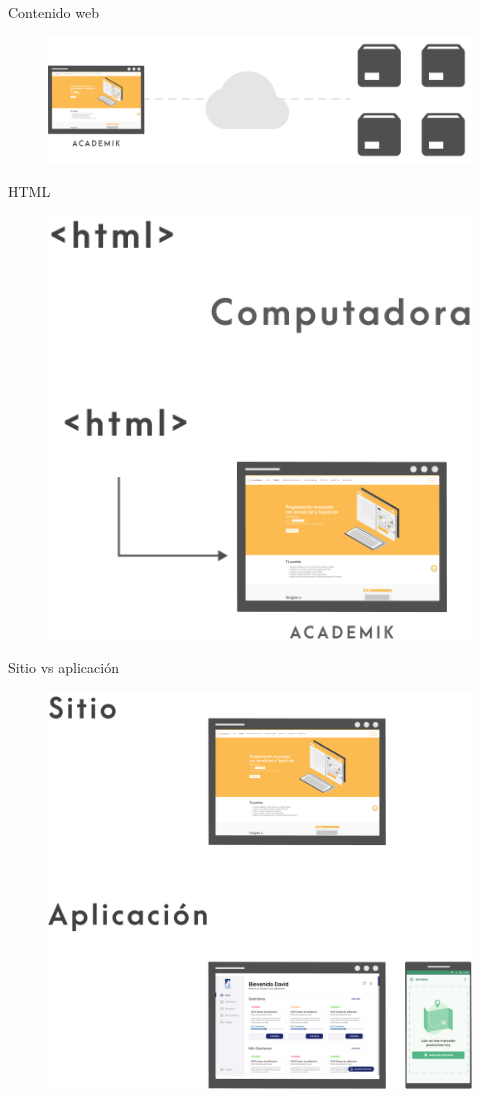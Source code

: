 \documentclass[aspectratio=169]{beamer}
\begin{document}
\begin{frame}{Contenido web}
	\begin{figure}
		\centering
		\includegraphics[width=\linewidth]{Images/internet}
	\end{figure}
\end{frame}

\begin{frame}{HTML}
	\begin{figure}
		\centering
		\includegraphics[width=0.50\linewidth]{Images/html.png}
	\end{figure}
\end{frame}


\begin{frame}{Sitio vs aplicación}
	\begin{figure}
		\centering
		\includegraphics[width=0.55\linewidth]{Images/sitioaplicacion}
	\end{figure}
\end{frame}
\end{document}

